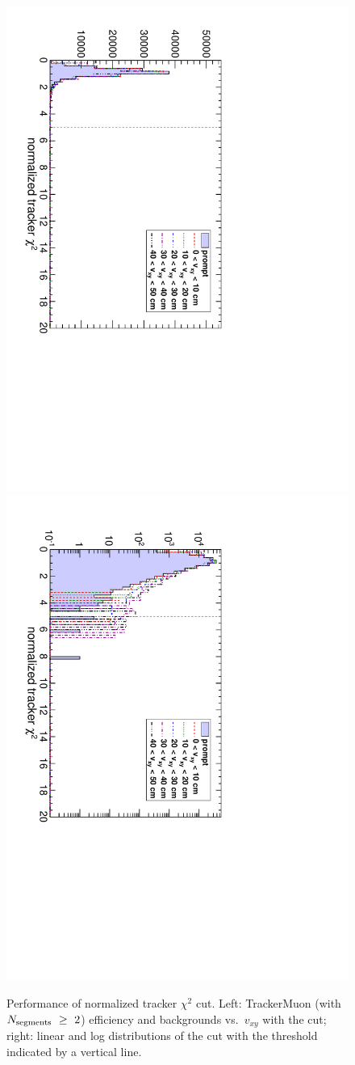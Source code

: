 \documentclass[12pt]{article}
\newcommand{\s}[1]{{\mbox{\scriptsize #1}}}
\begin{document}
\begin{figure}
\begin{center}
\begin{multicols}{2}
\includegraphics[height=\linewidth, angle=90]{fig/backgrounds3_plot/trackslinear_normchi2.pdf}
\includegraphics[height=\linewidth, angle=90]{fig/backgrounds3_plot/trackslog_normchi2.pdf}
\end{multicols}

\caption{Performance of normalized tracker $\chi^2$ cut.  Left: TrackerMuon (with $N_\s{segments}~\ge~2$) efficiency and backgrounds vs.\ $v_{xy}$ with the cut; right: linear and log distributions of the cut with the threshold indicated by a vertical line. \label{fig:normchi2}}
\end{center}
\end{figure}
\end{document}
